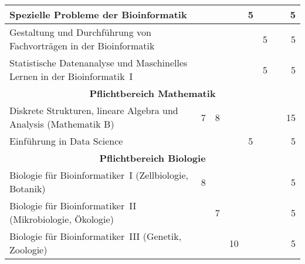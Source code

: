 \begin{table}[tbp]
\begin{small}
\begin{tabularx}{\textwidth}{|X||c|c|c|c|c|c||r|}
			Spezielle Probleme der Bioinformatik                                     &    &    &    & 5  &    &                               &           5 \\ \hline
			Gestaltung und Durchführung von Fachvorträgen in der Bioinformatik       &    &    &    &    & 5  &                               &           5 \\ \hline
			Statistische Datenanalyse und Maschinelles Lernen in der Bioinformatik~I &    &    &    &    & 5  &                               &           5 \\ \hline\hline
			\multicolumn{8}{|c|}{\textbf{Pflichtbereich Mathematik}}                                                                                        \\ \hline
			Diskrete Strukturen, lineare Algebra und Analysis (Mathematik B)         & 7  & 8  &    &    &    &                               &          15 \\ \hline
			Einführung in Data Science                                               &    &    &    & 5  &    &                               &           5 \\ \hline\hline
			\multicolumn{8}{|c|}{\textbf{Pflichtbereich Biologie}}                                                                                          \\ \hline
			Biologie für Bioinformatiker~I (Zellbiologie, Botanik)                                          & 8  &    &    &    &    &                               &           5 \\ \hline
			Biologie für Bioinformatiker~II (Mikrobiologie, Ökologie)                                         &    & 7  &    &    &    &                               &           5 \\ \hline
			Biologie für Bioinformatiker~III (Genetik, Zoologie)                                        &    &    & 10 &    &    &                               &           5 \\ \hline\hline

\end{tabularx}
\end{small}
\end{table}
